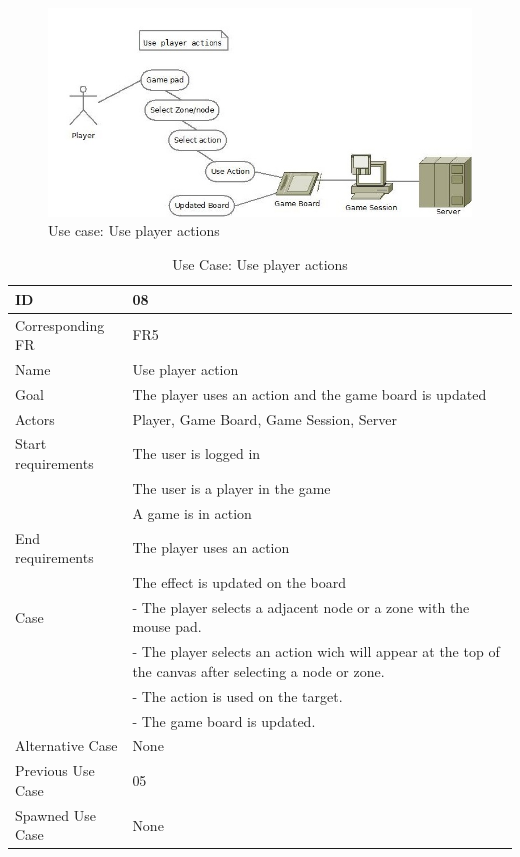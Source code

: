 \begin{figure}[H]
  \centering
    \includegraphics[width=1.0\textwidth]{img/useplayeractions.jpg}
  \caption{Use case: Use player actions} 
  \label{fig:useplayeractions}
\end{figure}


\begin{table}[H]
\begin{tabular}{|l|p{14cm}|}
\hline
	\textbf{ID} & \textbf{08}\\ \hline
	Corresponding FR & FR5\\ \hline
	Name & Use player action \\ \hline
	Goal & The player uses an action and the game board is updated\\ \hline
	Actors & Player, Game Board, Game Session, Server \\ \hline
	Start requirements & The user is logged in \\
				& The user is a player in the game\\
				& A game is in action\\ \hline
	End requirements & The player uses an action \\
				& The effect is updated on the board \\ \hline
	Case &- The player selects a adjacent node or a zone with the mouse pad.\\
		&- The player selects an action wich will appear at the top of the canvas after selecting a node or zone.\\
		&- The action is used on the target.\\
		&- The game board is updated.\\ \hline
	Alternative Case & None\\ \hline
	Previous Use Case & 05\\ \hline
	Spawned Use Case & None\\ \hline
\end{tabular}
\caption{Use Case: Use player actions}
\label{fig:usecase08table}
\end{table}



